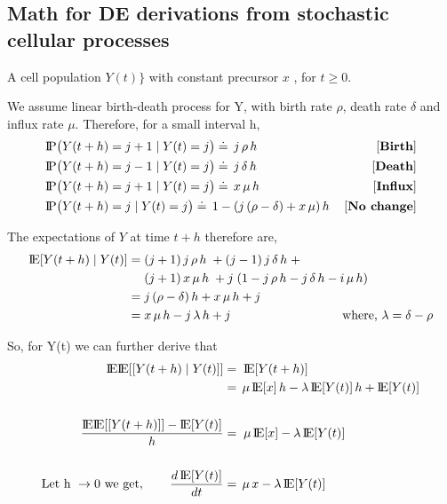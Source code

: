 \documentclass[11pt]{article} %
\newcommand{\probP}{\text{I\kern-0.15em P}}
\newcommand{\expE}{\text{I\kern-0.15em E}}
\newcommand{\gray}[1]{{\color{mygray}{#1}}}
\begin{document}
\pagestyle{fancy}
\fancyhf{}
\rhead{\textit{\gray{}}}

\subsection*{Math for DE derivations from stochastic cellular processes}
\vspace{0.4cm}
A cell population $Y(t)\}$ with constant precursor $x$ , for $t \ge 0$. 

We assume linear birth-death process for Y, with birth rate $\rho$, death rate $\delta$ and influx rate $\mu$. Therefore, for a small interval h, \begin{align*}
& \probP\big(Y(t+h) = j+1 \;|\; Y(t) = j \big) \doteq \, j \, \rho \, h  \qquad \qquad \qquad &[\textbf{Birth}] \\
& \probP\big(Y(t+h) = j-1 \;|\; Y(t) = j \big) \doteq \, j \, \delta \, h  &[\textbf{Death}] \\
& \probP\big(Y(t+h) = j+1 \;|\; Y(t) = j \big) \doteq \, x \, \mu \, h   &[\textbf{Influx}] \\
& \probP\big(Y(t+h) = j   \;|\; Y(t) = j \big) \doteq \, 1 - (j \, (\rho - \delta) + x \, \mu) \, h  &[\textbf{No change}] 
\end{align*}


The expectations of $Y$ at time $t+h$ therefore are,
\begin{align*}
\expE[Y(t+h) \;|\; Y(t)] = \; &(j+1) \, j \, \rho \, h \;+ 
(j-1) \, j \, \delta \, h \;+ \\
&(j+1) \, x \, \mu \, h \;+  j \; (1 - j \, \rho \, h - j \, \delta \, h - i \, \mu \, h) \\
= \; & j \, (\rho - \delta) \, h + x \, \mu \, h + j \\
= \; & x \, \mu \, h - j \, \lambda \, h + j \qquad \qquad \qquad \qquad \quad \text{where, }  \lambda = \delta - \rho 
\end{align*}

\vspace{5mm}

So, for Y(t) we can further derive that 
\begin{eqnarray*}
\begin{aligned}
    \expE\expE[[Y(t+h) \;|\; Y(t)]] &= \; \expE[Y(t+h)] \\
    &= \,  \mu \, \expE[x] \, h - \lambda \, \expE[Y(t)] \, h + \expE[Y(t)] \\
    \\
    \frac{\expE\expE[[Y(t+h)]] - \expE[Y(t)]}{h} &= \;  \mu \, \expE[x]  - \lambda \, \expE[Y(t)] \\
    \\
    \text{Let h } \rightarrow 0 \text{ we get}, \qquad \frac{d\, \expE[Y(t)]}{dt} &= \,  \mu \, x - \lambda \, \expE[Y(t)] \\
    \\
    \end{aligned}
\end{eqnarray*}
\end{document}
